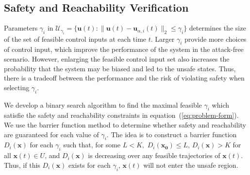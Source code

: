 \documentclass[journal]{IEEEtran}
\begin{document}
\subsection{Safety and Reachability Verification}
\label{subsec:barrier-certificate}

Parameters $\gamma_i$ in $\mathcal{U}_{\gamma_i} = \{\mathbf{u}(t) : \|\mathbf{u}(t)-\mathbf{u}_{\alpha,i}(t)\|_{2} \leq \gamma_i\}$ determines the size of the set of feasible control inputs at each time $t$. Larger $\gamma_i$ provide more choices of control input, which improve the performance of the system in the attack-free scenario. However, enlarging the feasible control input set also increases the probability that the system may be biased and led to the unsafe states. Thus, there is a tradeoff between the performance and the risk of violating safety when selecting $\gamma_i$.

We develop a binary search algorithm to find the maximal feasible $\gamma_i$ which satisfie the safety and reachability constraints in equation~(\ref{eq:problem-form}). We use the barrier function method to determine whether safety and reachability are guaranteed for each value of $\gamma_i.$ The idea is to construct a barrier function $D_i(\mathbf{x})$ for each $\gamma_i$ such that, for some $L<K,$ $D_i(\mathbf{x_0}) \leq L$, $D_i(\mathbf{x}) > K$ for all $\mathbf{x}(t) \in U$, and $D_i(\mathbf{x})$ is decreasing over any feasible trajectories of $\mathbf{x}(t).$ Thus, if this $D_i(\mathbf{x})$ exists for each $\gamma_i$, $\mathbf{x}(t)$ will not enter the unsafe region.
\end{document}
